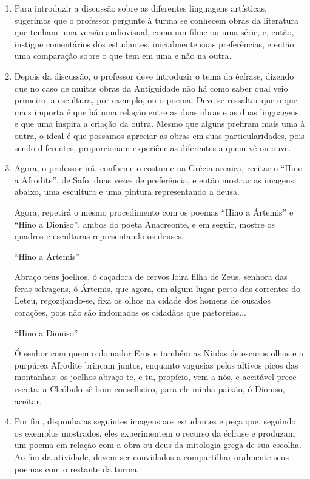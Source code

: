 \documentclass[12pt]{extarticle}
\begin{document}
\begin{enumerate}

\item
Para introduzir a discussão sobre as diferentes linguagens artísticas, sugerimos
que o professor pergunte à turma se conhecem obras da literatura que tenham
uma versão audiovisual, como um filme ou uma série, e, então, instigue comentários
dos estudantes, inicialmente suas preferências, e então uma comparação sobre o que
tem em uma e não na outra. 

\item
Depois da discussão, o professor deve introduzir o tema da écfrase, dizendo que
no caso de muitas obras da Antiguidade não há como saber qual veio primeiro,
a escultura, por exemplo, ou o poema. Deve se ressaltar que o que mais importa
é que há uma relação entre as duas obras e as duas linguagens, e que uma inspira
a criação da outra. Mesmo que alguns prefiram mais uma à outra, o ideal é que 
possamos apreciar as obras em suas particularidades, pois sendo diferentes, 
proporcionam experiências diferentes a quem vê ou ouve. 

\item
Agora, o professor irá, conforme o costume na Grécia arcaica, recitar o ``Hino
a Afrodite'', de Safo, duas vezes de preferência, e então mostrar as imagens
abaixo, uma escultura e uma pintura representando a deusa. 


Agora, repetirá o mesmo procedimento com os poemas ``Hino a Ártemis'' e 
``Hino a Dioniso'', ambos do poeta Anacreonte, e em seguir, mostre os quadros 
e esculturas representando os deuses.

``Hino a Ártemis''

Abraço teus joelhos, ó caçadora de cervos
loira filha de Zeus, senhora 
das feras selvagens, ó Ártemis,
que agora, em algum lugar perto
das correntes do Leteu, regozijando-se,
fixa os olhos na cidade dos homens
de ousados corações, pois não são indomados
os cidadãos que pastoreias...

``Hino a Dioniso''

Ó senhor com quem o domador Eros
e também as Ninfas de escuros olhos 
e a purpúrea Afrodite
brincam juntos, enquanto vagueias 
pelos altivos picos das montanhas:
os joelhos abraço-te, e tu, propício,
vem a nós, e aceitável
prece escuta:
a Cleóbulo sê bom
conselheiro, para ele minha paixão,
ó Dioniso, aceitar. 


\item
Por fim, disponha as seguintes imagens aos estudantes e peça que, seguindo os exemplos
mostrados, eles experimentem o recurso da écfrase e produzam um poema em relação
com a obra ou deus da mitologia grega de sua escolha. Ao fim da atividade, 
devem ser convidados a compartilhar oralmente seus poemas com o restante da turma.


\end{enumerate}
\end{document}
